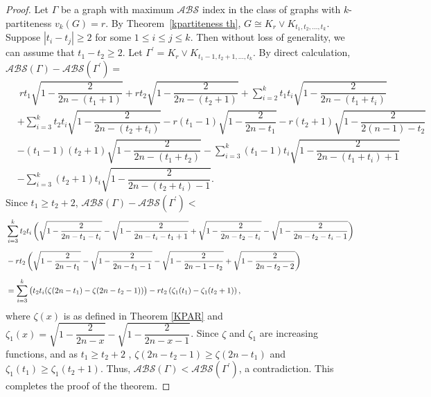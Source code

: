\documentclass[12pt]{article}
\begin{document}
\begin{proof}
Let $\Gamma$ be a graph with maximum $\mathcal{ABS}$ index in the class of graphs with $k$-partiteness $v_{k}(G)=r$.  
By Theorem~\ref{kpartiteness th}, $G\cong K_r\vee K_{t_1,t_2,\dots,t_k}$. Suppose $|t_{i}-t_{j}|\ge 2$ for some $1\le i\le j\le k$. Then without loss of generality, we can  assume that $t_{1}-t_{2}\ge2$. Let $\Gamma^{\prime}=K_{r}\vee K_{t_1-1,t_2+1,\dots,t_k}$. By direct calculation,
 $\mathcal{ABS}(\Gamma)-\mathcal{ABS}(\Gamma^{\prime})=$ \begin{align*}&~rt_1\sqrt{1-\dfrac{2}{2n-(t_1+1)}}+rt_2\sqrt{1-\dfrac{2}{2n-(t_2+1)}}+\sum\limits_{i=2}^k t_1t_i\sqrt{1-\dfrac{2}{2n-(t_1+t_i)}}\\[2mm]&+\sum\limits_{i=3}^k t_2t_i\sqrt{1-\dfrac{2}{2n-(t_2+t_i)}}-r(t_1-1)\sqrt{1-\dfrac{2}{2n-t_1}}-r(t_2+1)\sqrt{1-\dfrac{2}{2(n-1)-t_2}}\\[2mm]&-(t_1-1)(t_2+1)\sqrt{1-\dfrac{2}{2n-(t_1+t_2)}}-\sum\limits_{i=3}^k (t_1-1)t_i\sqrt{1-\dfrac{2}{2n-(t_1+t_i)+1}}\\[2mm]&-\sum\limits_{i=3}^k (t_2+1)t_i\sqrt{1-\dfrac{2}{2n-(t_2+t_i)-1}}.
\end{align*}
Since $t_{1}\ge t_{2}+2$, $\mathcal{ABS}(\Gamma)-\mathcal{ABS}(\Gamma^{\prime})<$ {\small\begin{align*}\label{peeq2} &\sum\limits_{i=3}^k t_2t_i\left(\sqrt{1-\dfrac{2}{2n-t_1-t_i}}-\sqrt{1-\dfrac{2}{2n-t_i-t_1+1}}+\sqrt{1-\dfrac{2}{2n-t_2-t_i}}-\sqrt{1-\dfrac{2}{2n-t_2-t_i-1}}\right)\notag\\[2mm]&-rt_{2}\left(\sqrt{1-\dfrac{2}{2n-t_1}}-\sqrt{1-\dfrac{2}{2n-t_1-1}}-\sqrt{1-\dfrac{2}{2n-1-t_2}}+\sqrt{1-\dfrac{2}{2n-t_2-2}}\right)\notag\\[2mm]
&=\sum\limits_{i=3}^k\big(t_2t_i(\zeta(2n-t_{1})-\zeta(2n-t_{2}-1))\big)-rt_{2}\left(\zeta_{1}(t_{1})-\zeta_{1}(t_{2}+1)\right),	
\end{align*}}
where $\zeta(x)$ is as defined in Theorem \ref{KPAR} and $\zeta_{1}(x)=\sqrt{1-\dfrac{2}{2n-x}}-\sqrt{1-\dfrac{2}{2n-x-1}}$. Since $\zeta$ and $\zeta_{1}$ are increasing functions, and as $t_{1}\ge t_{2}+2$ , $\zeta(2n-t_{2}-1)\ge \zeta(2n-t_{1})$ and $\zeta_{1}(t_{1})\ge \zeta_{1}(t_{2}+1)$. Thus, $\mathcal{ABS}(\Gamma)<\mathcal{ABS}(\Gamma^{\prime})$, a contradiction. This completes the proof of the theorem. 
\end{proof}
 
\end{document}

